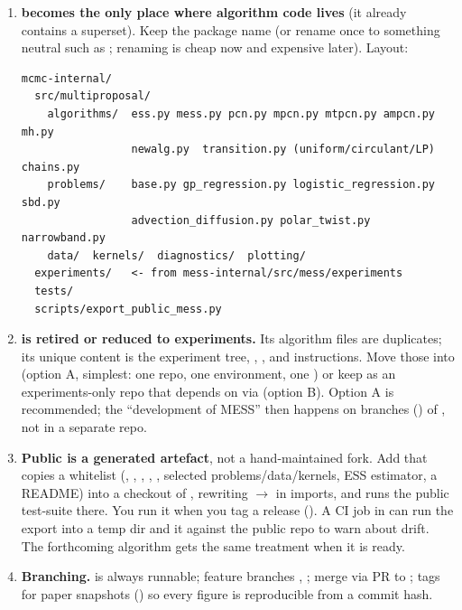 \documentclass[11pt,a4paper]{article}
\theoremstyle{remark}
\begin{document}
\begin{enumerate}[leftmargin=*]
\item \textbf{ becomes the only place where algorithm code lives} (it already contains a superset). Keep the package name  (or rename once to something neutral such as ; renaming is cheap now and expensive later). Layout:
\begin{verbatim}
mcmc-internal/
  src/multiproposal/
    algorithms/  ess.py mess.py pcn.py mpcn.py mtpcn.py ampcn.py mh.py
                 newalg.py  transition.py (uniform/circulant/LP)  chains.py
    problems/    base.py gp_regression.py logistic_regression.py sbd.py
                 advection_diffusion.py polar_twist.py narrowband.py
    data/  kernels/  diagnostics/  plotting/
  experiments/   <- from mess-internal/src/mess/experiments
  tests/
  scripts/export_public_mess.py
\end{verbatim}
\item \textbf{ is retired or reduced to experiments.} Its algorithm files are duplicates; its unique content is the experiment tree, , , and instructions. Move those into  (option A, simplest: one repo, one environment, one ) or keep  as an experiments-only repo that depends on  via  (option B). Option A is recommended; the ``development of MESS'' then happens on branches () of , not in a separate repo.
\item \textbf{Public  is a generated artefact}, not a hand-maintained fork. Add  that copies a whitelist (, , , , , selected problems/data/kernels, ESS estimator, a README) into a checkout of , rewriting  $\to$  in imports, and runs the public test-suite there. You run it when you tag a release (). A CI job in  can run the export into a temp dir and  it against the public repo to warn about drift. The forthcoming algorithm gets the same treatment when it is ready.
\item \textbf{Branching.}  is always runnable; feature branches , ; merge via PR to ; tags for paper snapshots () so every figure is reproducible from a commit hash.

\end{enumerate}
\end{document}
